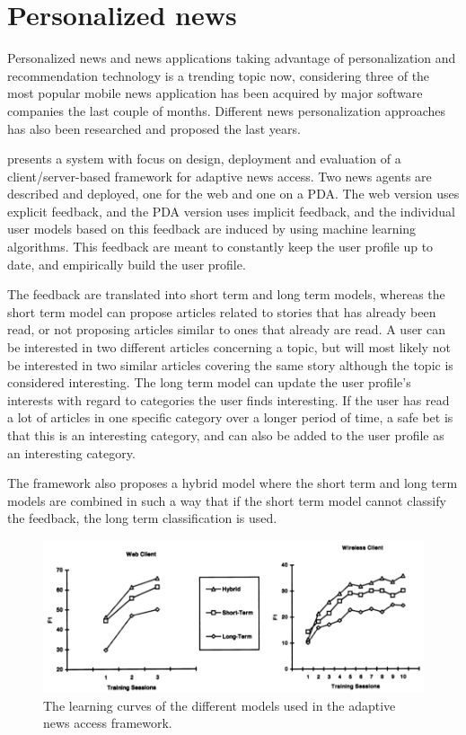 \section{Personalized news}
\label{related_work_personlized_news}
Personalized news and news applications taking advantage of personalization and recommendation technology is a trending topic now, considering three of the most popular mobile news application has been acquired by major software companies the last couple of months\cite{linkedin_acquires_pulse}\cite{google_acquired_wavii}\cite{summly_sold_yahoo}. Different news personalization approaches has also been researched and proposed the last years.

\cite{billsus2000user} presents a system with focus on design, deployment and evaluation of a client/server-based framework for adaptive news access. Two news agents are described and deployed, one for the web and one on a PDA. The web version uses explicit feedback, and the PDA version uses implicit feedback, and the individual user models based on this feedback are induced by using machine learning algorithms. This feedback are meant to constantly keep the user profile up to date, and empirically build the user profile.

The feedback are translated into short term and long term models, whereas the short term model can propose articles related to stories that has already been read, or not proposing articles similar to ones that already are read. A user can be interested in two different articles concerning a topic, but will most likely not be interested in two similar articles covering the same story although the topic is considered interesting. The long term model can update the user profile's interests with regard to categories the user finds interesting. If the user has read a lot of articles in one specific category over a longer period of time, a safe bet is that this is an interesting category, and can also be added to the user profile as an interesting category.

The framework also proposes a hybrid model where the short term and long term models are combined in such a way that if the short term model cannot classify the feedback, the long term classification is used. 

\begin{figure}[!htbp]
\centering
\includegraphics[width=130mm]{GFX/tech/adaptiveNewsAccessShortLongHybridTerm.png}
\caption{The learning curves of the different models used in the adaptive news access framework.}
\label{adaptive_news_access_learning_curves}
\end{figure}

